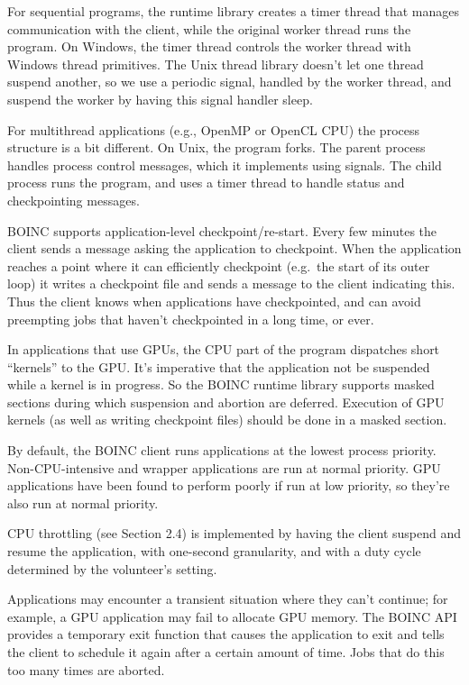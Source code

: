 \documentclass[
]{article}
\begin{document}
For sequential programs, the runtime library creates a timer thread that
manages communication with the client, while the original worker thread
runs the program. On Windows, the timer thread controls the worker
thread with Windows thread primitives. The Unix thread library doesn't
let one thread suspend another, so we use a periodic signal, handled by
the worker thread, and suspend the worker by having this signal handler
sleep.

For multithread applications (e.g., OpenMP or OpenCL CPU) the process
structure is a bit different. On Unix, the program forks. The parent
process handles process control messages, which it implements using
signals. The child process runs the program, and uses a timer thread to
handle status and checkpointing messages.

BOINC supports application-level checkpoint/re-start. Every few minutes
the client sends a message asking the application to checkpoint. When
the application reaches a point where it can efficiently checkpoint
(e.g.~the start of its outer loop) it writes a checkpoint file and sends
a message to the client indicating this. Thus the client knows when
applications have checkpointed, and can avoid preempting jobs that
haven't checkpointed in a long time, or ever.

In applications that use GPUs, the CPU part of the program dispatches
short ``kernels'' to the GPU. It's imperative that the application not
be suspended while a kernel is in progress. So the BOINC runtime library
supports masked sections during which suspension and abortion are
deferred. Execution of GPU kernels (as well as writing checkpoint files)
should be done in a masked section.

By default, the BOINC client runs applications at the lowest process
priority. Non-CPU-intensive and wrapper applications are run at normal
priority. GPU applications have been found to perform poorly if run at
low priority, so they're also run at normal priority.

CPU throttling (see Section 2.4) is implemented by having the client
suspend and resume the application, with one-second granularity, and
with a duty cycle determined by the volunteer's setting.

Applications may encounter a transient situation where they can't
continue; for example, a GPU application may fail to allocate GPU
memory. The BOINC API provides a temporary exit function that causes the
application to exit and tells the client to schedule it again after a
certain amount of time. Jobs that do this too many times are aborted.
\end{document}
